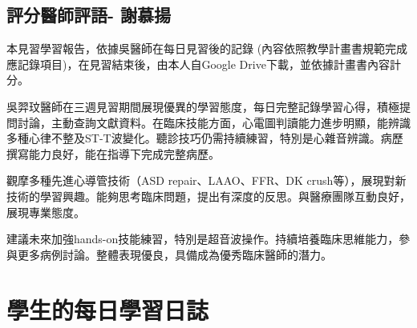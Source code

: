 \documentclass[12pt,a4paper]{article}
\begin{document}
\subsection{評分醫師評語- 謝慕揚}

本見習學習報告，依據吳醫師在每日見習後的記錄 (內容依照教學計畫書規範完成應記錄項目)，在見習結束後，由本人自Google Drive下載，並依據計畫書內容計分。

吳羿玟醫師在三週見習期間展現優異的學習態度，每日完整記錄學習心得，積極提問討論，主動查詢文獻資料。在臨床技能方面，心電圖判讀能力進步明顯，能辨識多種心律不整及ST-T波變化。聽診技巧仍需持續練習，特別是心雜音辨識。病歷撰寫能力良好，能在指導下完成完整病歷。

觀摩多種先進心導管技術（ASD repair、LAAO、FFR、DK crush等），展現對新技術的學習興趣。能夠思考臨床問題，提出有深度的反思。與醫療團隊互動良好，展現專業態度。

建議未來加強hands-on技能練習，特別是超音波操作。持續培養臨床思維能力，參與更多病例討論。整體表現優良，具備成為優秀臨床醫師的潛力。

\vspace{1cm}
\noindent

\section{學生的每日學習日誌}

\end{document}
